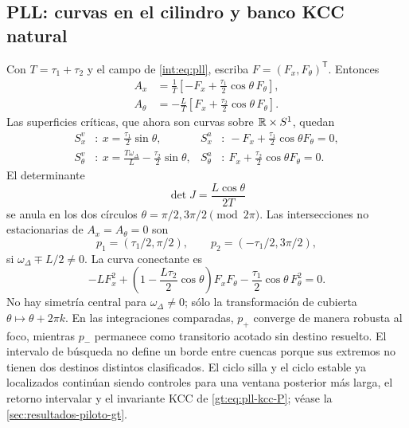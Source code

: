 \subsection{PLL: curvas en el cilindro y banco KCC natural}
\label{subsec:casegt-pll}

Con $T=\tau_1+\tau_2$ y el campo de \cref{int:eq:pll}, escriba
$F=(F_x,F_\theta)^{\mathsf T}$. Entonces
\begin{align}
 A_x&=\frac1T\left[-F_x+\frac{\tau_1}{2}
 \cos\theta\,F_\theta\right],\nonumber\\
 A_\theta&=-\frac LT\left[F_x+\frac{\tau_2}{2}
 \cos\theta\,F_\theta\right].
 \label{casegt:eq:pll-A}
\end{align}
Las superficies críticas, que ahora son curvas sobre
$\mathbb{R}\times S^1$, quedan
\begin{align}
 S_x^v&:\ x=\frac{\tau_1}{2}\sin\theta,&
 S_x^a&:\ -F_x+\frac{\tau_1}{2}\cos\theta F_\theta=0,\nonumber\\
 S_\theta^v&:\ x=\frac{T\omega_\Delta}{L}
 -\frac{\tau_2}{2}\sin\theta,&
 S_\theta^a&:\ F_x+\frac{\tau_2}{2}\cos\theta F_\theta=0.
 \label{casegt:eq:pll-surfaces}
\end{align}
El determinante
\begin{equation}
 \det J=\frac{L\cos\theta}{2T}
 \label{casegt:eq:pll-det}
\end{equation}
se anula en los dos círculos
$\theta=\pi/2,3\pi/2\pmod{2\pi}$. Las intersecciones no estacionarias de
$A_x=A_\theta=0$ son
\begin{equation}
 p_1=(\tau_1/2,\pi/2),
 \qquad p_2=(-\tau_1/2,3\pi/2),
 \label{casegt:eq:pll-PP}
\end{equation}
si $\omega_\Delta\mp L/2\ne0$. La curva conectante es
\begin{equation}
 -LF_x^2+
 \left(1-\frac{L\tau_2}{2}\cos\theta\right)F_xF_\theta
 -\frac{\tau_1}{2}\cos\theta\,F_\theta^2=0.
 \label{casegt:eq:pll-CC}
\end{equation}
No hay simetría central para $\omega_\Delta\ne0$; sólo la transformación de
cubierta $\theta\mapsto\theta+2\pi k$.
En las integraciones comparadas, $p_+$ converge de manera
robusta al foco, mientras $p_-$ permanece como transitorio acotado
sin destino resuelto.
\ifHAFOBasinMaterial
El intervalo de búsqueda no define un borde entre cuencas porque sus
extremos no tienen dos destinos distintos clasificados.
\fi
El ciclo silla y el ciclo estable ya localizados continúan siendo controles para una ventana
posterior más larga, el retorno intervalar y el invariante KCC de
\eqref{gt:eq:pll-kcc-P}; véase la \cref{sec:resultados-piloto-gt}.

